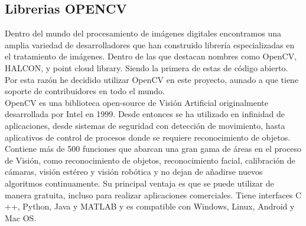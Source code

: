 \subsection{Librerias OPENCV}
Dentro del mundo del procesamiento de imágenes digitales encontramos una amplia variedad
de desarrolladores que han construido librería especializadas en el tratamiento de
imágenes. Dentro de las que destacan nombres como OpenCV, HALCON, y point cloud library.
Siendo la primera de estas de código abierto. Por esta razón he decidido utilizar
OpenCV en este proyecto, aunado a que tiene soporte de contribuidores en todo el mundo.\\
OpenCV es una biblioteca open-source de Visión Artificial originalmente desarrollada por
Intel en 1999. Desde entonces se ha utilizado en infinidad de aplicaciones, desde
sistemas de seguridad con detección de movimiento, hasta aplicativos de control de
procesos donde se requiere reconocimiento de objetos. Contiene más de 500 funciones
que abarcan una gran gama de áreas en el proceso de Visión, como reconocimiento de
objetos, reconocimiento facial, calibración de cámaras, visión estéreo y visión
robótica y no dejan de añadirse nuevos algoritmos continuamente. Su principal ventaja
es que se puede utilizar de manera gratuita, incluso para realizar aplicaciones
comerciales.\cite{WEB:Opencv}
Tiene interfaces C ++, Python, Java y MATLAB y es compatible con Windows, Linux,
Android y Mac OS.

